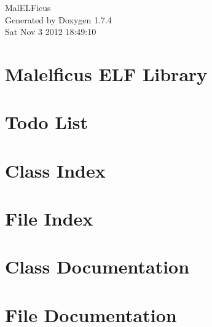 \documentclass[a4paper]{book}
\begin{document}
\hypersetup{pageanchor=false}
\begin{titlepage}
\vspace*{7cm}
\begin{center}
{\Large MalELFicus }\\
\vspace*{1cm}
{\large Generated by Doxygen 1.7.4}\\
\vspace*{0.5cm}
{\small Sat Nov 3 2012 18:49:10}\\
\end{center}
\end{titlepage}
\clearemptydoublepage
{}
\tableofcontents
\clearemptydoublepage
{}
\hypersetup{pageanchor=true}
\chapter{Malelficus ELF Library}
\label{index}\hypertarget{index}{}
\chapter{Todo List}
\label{todo}
\hypertarget{todo}{}

\chapter{Class Index}

\chapter{File Index}

\chapter{Class Documentation}








\chapter{File Documentation}




























\printindex
\end{document}

